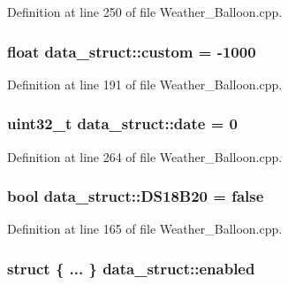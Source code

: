 Definition at line 250 of file Weather\+\_\+\+Balloon.\+cpp.

\subsubsection[{\texorpdfstring{custom}{custom}}]{\setlength{\rightskip}{0pt plus 5cm}float data\+\_\+struct\+::custom = -\/1000}\hypertarget{structdata__struct_a30f45bc3cbb8da0e26bd13fe3e243759}{}\label{structdata__struct_a30f45bc3cbb8da0e26bd13fe3e243759}


Definition at line 191 of file Weather\+\_\+\+Balloon.\+cpp.

\subsubsection[{\texorpdfstring{date}{date}}]{\setlength{\rightskip}{0pt plus 5cm}uint32\+\_\+t data\+\_\+struct\+::date = 0}\hypertarget{structdata__struct_ad90875e8758f0f73932943d135e9b831}{}\label{structdata__struct_ad90875e8758f0f73932943d135e9b831}


Definition at line 264 of file Weather\+\_\+\+Balloon.\+cpp.

\subsubsection[{\texorpdfstring{D\+S18\+B20}{DS18B20}}]{\setlength{\rightskip}{0pt plus 5cm}bool data\+\_\+struct\+::\+D\+S18\+B20 = false}\hypertarget{structdata__struct_abe741a20e8c5e6695ae32937f878a83b}{}\label{structdata__struct_abe741a20e8c5e6695ae32937f878a83b}


Definition at line 165 of file Weather\+\_\+\+Balloon.\+cpp.

\subsubsection[{\texorpdfstring{enabled}{enabled}}]{\setlength{\rightskip}{0pt plus 5cm}struct \{ ... \}   data\+\_\+struct\+::enabled}\hypertarget{structdata__struct_a806a54c6a6125ca7b0d2c5d90bb6acec}{}\label{structdata__struct_a806a54c6a6125ca7b0d2c5d90bb6acec}
